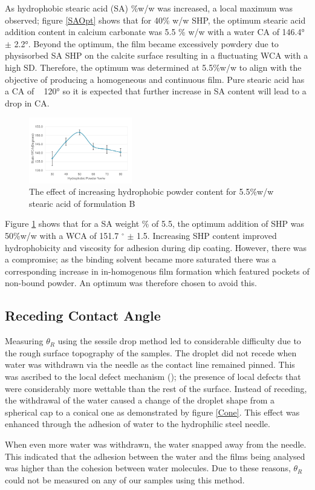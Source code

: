 As hydrophobic stearic acid (SA) \%w/w was increased, a local maximum was observed; figure \ref{SAOpt} shows that for 40\% w/w SHP, the optimum stearic acid addition content in calcium carbonate was 5.5 \% w/w with a water CA of 146.4° $\pm$ 2.2°. Beyond the optimum, the film became excessively powdery due to physisorbed SA SHP on the calcite surface resulting in a fluctuating WCA with a high SD. Therefore, the optimum was determined at 5.5\%w/w to align with the objective of producing a homogeneous and continuous film. Pure stearic acid has a CA of ~ 120° so it is expected that further increase in SA content will lead to a drop in CA.

\begin{figure}[h!]
\centering
  \includegraphics[width=0.4\textwidth]{Sections/Figures/HPOptimise.png}
  \caption{The effect of increasing hydrophobic powder content for 5.5\%w/w stearic acid of formulation B }\label{HPOpt}
\end{figure}

Figure \ref{HPOpt} shows that for a SA weight \% of 5.5, the optimum addition of SHP was 50\%w/w with a WCA of 151.7 $^\circ$ $\pm$ 1.5. Increasing SHP content improved hydrophobicity and viscosity for adhesion during dip coating. However, there was a compromise; as the binding solvent became more saturated there was a corresponding increase in in-homogenous film formation which featured pockets of non-bound powder. An optimum was therefore chosen to avoid this.   


\subsection{Receding Contact Angle}
Measuring $\theta_R$ using the sessile drop method led to considerable difficulty due to the rough surface topography of the samples. The droplet did not recede when water was withdrawn via the needle as the contact line remained pinned. This was ascribed to the local defect mechanism (\cite{hong_chang_chou_chan_sheng_tsao_2011}); the presence of local defects that were considerably more wettable than the rest of the surface. Instead of receding, the withdrawal of the water caused a change of the droplet shape from a spherical cap to a conical one as demonstrated by figure \ref{Cone}. This effect was enhanced through the adhesion of water to the hydrophilic steel needle.   
\par When even more water was withdrawn, the water snapped away from the needle. This indicated that the adhesion between the water and the films being analysed was higher than the cohesion between water molecules. Due to these reasons, $\theta_R$ could not be measured on any of our samples using this method. 



